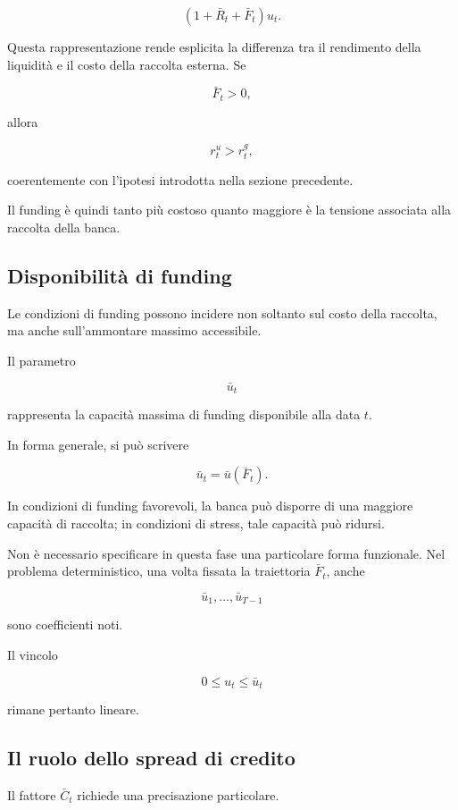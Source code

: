 \[
\left(
1+\bar{R}_t+\bar{F}_t
\right)u_t.
\]

Questa rappresentazione rende esplicita la differenza tra il rendimento della
liquidit\`a e il costo della raccolta esterna. Se

\[
\bar{F}_t>0,
\]

\noindent allora

\[
r^u_t>r^g_t,
\]

\noindent coerentemente con l'ipotesi introdotta nella sezione precedente.

Il funding \`e quindi tanto pi\`u costoso quanto maggiore \`e la tensione
associata alla raccolta della banca.

\subsection{Disponibilit\`a di funding}

Le condizioni di funding possono incidere non soltanto sul costo della
raccolta, ma anche sull'ammontare massimo accessibile.

Il parametro

\[
\bar{u}_t
\]

\noindent rappresenta la capacit\`a massima di funding disponibile alla data $t$.

In forma generale, si pu\`o scrivere

\[
\bar{u}_t
=
\bar{u}(\bar{F}_t).
\]

In condizioni di funding favorevoli, la banca pu\`o disporre di una maggiore
capacit\`a di raccolta; in condizioni di stress, tale capacit\`a pu\`o
ridursi.

Non \`e necessario specificare in questa fase una particolare forma
funzionale. Nel problema deterministico, una volta fissata la traiettoria
$\bar{F}_t$, anche

\[
\bar{u}_1,\ldots,\bar{u}_{T-1}
\]

\noindent sono coefficienti noti.

Il vincolo

\[
0\leq u_t\leq\bar{u}_t
\]

\noindent rimane pertanto lineare.

\subsection{Il ruolo dello spread di credito}

Il fattore $\bar{C}_t$ richiede una precisazione particolare.

